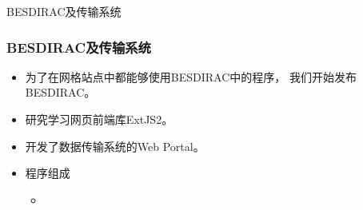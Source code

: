 \begin{frame}
    \begin{center}
        \LARGE BESDIRAC及传输系统
    \end{center}
\end{frame}

\begin{frame}
    \frametitle{BESDIRAC及传输系统}
    \begin{itemize}
        \item 为了在网格站点中都能够使用BESDIRAC中的程序，
              我们开始发布BESDIRAC。
        \item 研究学习网页前端库ExtJS2。
        \item 开发了数据传输系统的Web Portal。
        \item 程序组成
            \begin{itemize}
                \item 
            \end{itemize}
    \end{itemize}
\end{frame}
